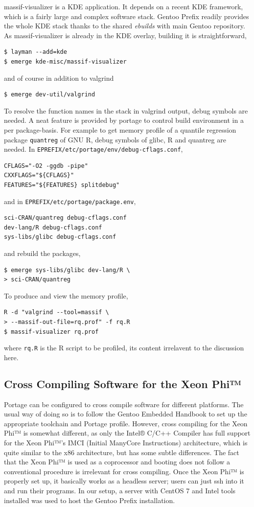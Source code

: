 \documentclass[a4paper,conference]{IEEEtran}
\begin{document}
massif-visualizer is a KDE application.  It depends on a recent KDE
framework, which is a fairly large and complex software stack.  Gentoo
Prefix readily provides the whole KDE stack thanks to the shared
\textit{ebuilds} with main Gentoo repository.  As massif-visualizer is
already in the KDE overlay, building it is straightforward,
\begin{verbatim}
$ layman --add=kde
$ emerge kde-misc/massif-visualizer
\end{verbatim}
and of course in addition to valgrind
\begin{verbatim}
$ emerge dev-util/valgrind
\end{verbatim}

To resolve the function names in the stack in valgrind output, debug
symbols are needed.  A neat feature is provided by portage to control
build environment in a per package-basis.  For example to get memory
profile of a quantile regression package \texttt{quantreg} of GNU R,
debug symbols of glibc, R and quantreg are needed. In
\texttt{EPREFIX/etc/portage/env/debug-cflags.conf},
\begin{verbatim}
CFLAGS="-O2 -ggdb -pipe"
CXXFLAGS="${CFLAGS}"
FEATURES="${FEATURES} splitdebug"
\end{verbatim}
and in \texttt{EPREFIX/etc/portage/package.env},
\begin{verbatim}
sci-CRAN/quantreg debug-cflags.conf
dev-lang/R debug-cflags.conf
sys-libs/glibc debug-cflags.conf
\end{verbatim}
and rebuild the packages,
\begin{verbatim}
$ emerge sys-libs/glibc dev-lang/R \
> sci-CRAN/quantreg
\end{verbatim}

To produce and view the memory profile,
\begin{verbatim}
R -d "valgrind --tool=massif \
> --massif-out-file=rq.prof" -f rq.R
$ massif-visualizer rq.prof
\end{verbatim}
where \texttt{rq.R} is the R script to be profiled, its content
irrelavent to the discussion here.

\subsection{Cross Compiling Software for the Xeon Phi™}

Portage can be configured to cross compile software for different
platforms. The usual way of doing so is to follow the Gentoo Embedded
Handbook \cite{gentoo:embedded} to set up the appropriate toolchain and
Portage profile. However, cross compiling for the Xeon Phi™ is somewhat
different, as only the Intel® C/C++ Compiler has full support for the
Xeon Phi™'s IMCI (Initial ManyCore Instructions) architecture, which is
quite similar to the x86 architecture, but has some subtle differences.
The fact that the Xeon Phi™ is used as a coprocessor and booting does
not follow a conventional procedure is irrelevant for cross compiling.
Once the Xeon Phi™ is properly set up, it basically works as a headless
server; users can just ssh into it and run their programs. In our setup,
a server with CentOS 7 and Intel tools installed was used to host the
Gentoo Prefix installation.
\end{document}
